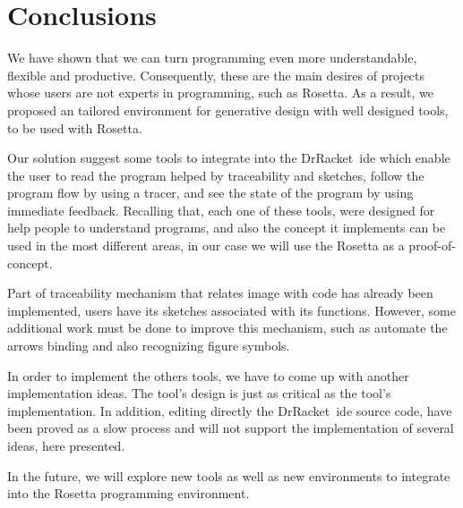 
% 
% 

\section{Conclusions}

We have shown that we can turn programming even more understandable, flexible and productive. Consequently, these are the main desires of projects whose users are not experts in programming, such as Rosetta. As a result, we proposed an tailored environment for generative design with well designed tools, to be used with Rosetta.

Our solution suggest some tools to integrate into the DrRacket~\ac{ide} which enable the user to read the program helped by traceability and sketches, follow the program flow by using a tracer, and see the state of the program by using immediate feedback. Recalling that, each one of these tools, were designed for help people to understand programs, and also the concept it implements can be used in the most different areas, in our case we will use the Rosetta as a proof-of-concept.

Part of traceability mechanism that relates image with code has already been implemented, users have its sketches associated with its functions. However, some additional work must be done to improve this mechanism, such as automate the arrows binding and also recognizing figure symbols.

In order to implement the others tools, we have to come up with another implementation ideas. The tool's design is just as critical as the tool's implementation. In addition, editing directly the DrRacket~\ac{ide} source code, have been proved as a slow process and will not support the implementation of several ideas, here presented. 

In the future, we will explore new tools as well as new environments to integrate into the Rosetta programming environment.